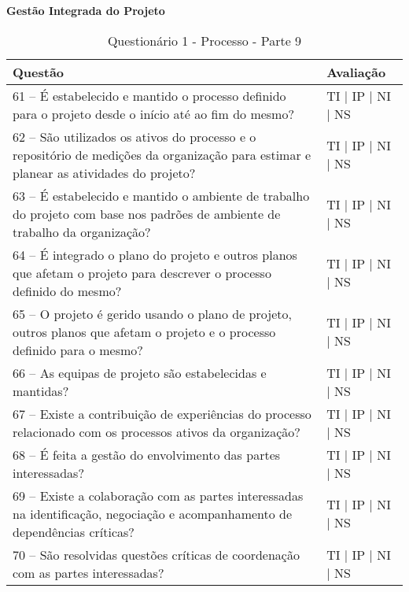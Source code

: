 \documentclass[openany,10pt,a4paper]{article}
\begin{document}
\begin{longtable}
\begin{appendix}
\begin{table}[h]
\textbf{Gestão Integrada do Projeto}
	\centering
	\caption{Questionário 1 - Processo - Parte 9}
	\begin{tabular}{p{3.5in}p{2in}}		
		\toprule
		\textbf{Questão}  & \textbf{Avaliação}\\ 
		\midrule
		61 – É estabelecido e mantido o processo definido para o projeto desde o início até ao fim do mesmo?
 & TI | IP | NI | NS \\
        \midrule
		62 – São utilizados os ativos do processo e o repositório de medições da organização para 
estimar e planear as atividades do projeto?
 & TI | IP | NI | NS \\
		\midrule
		63 – É estabelecido e mantido o ambiente de trabalho do projeto com base nos padrões de 
ambiente de trabalho da organização?
 & TI | IP | NI | NS \\
		\midrule
        64 – É integrado o plano do projeto e outros planos que afetam o projeto para descrever o 
processo definido do mesmo?
 & TI | IP | NI | NS \\
		\midrule
		65 – O projeto é gerido usando o plano de projeto, outros planos que afetam o projeto e o 
processo definido para o mesmo?
  & TI | IP | NI | NS \\
		\midrule
		66 – As equipas de projeto são estabelecidas e mantidas?
 & TI | IP | NI | NS \\
        \midrule
		67 – Existe a contribuição de experiências do processo relacionado com os processos ativos da 
organização?
 & TI | IP | NI | NS \\
        \midrule
		68 – É feita a gestão do envolvimento das partes interessadas?
 & TI | IP | NI | NS \\
        \midrule
		69  – Existe a colaboração com as partes interessadas na identificação, negociação e 
acompanhamento de dependências críticas?
 & TI | IP | NI | NS \\
        \midrule
		70 – São resolvidas questões críticas de coordenação com as partes interessadas?
 & TI | IP | NI | NS \\
		\bottomrule
	\end{tabular} 
	\label{tab:tabela1}
\end{table}


\end{appendix}
\end{longtable}
\end{document}
